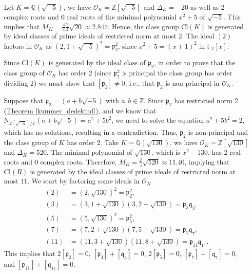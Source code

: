 \documentclass[openany, a4paper, 10pt]{book}
\theoremstyle{plain}
\theoremstyle{plain}
\theoremstyle{plain}
\theoremstyle{definition}
\theoremstyle{plain}
\theoremstyle{definition}
\theoremstyle{remark}
\newcommand{\theoref}[1]{\hyperref[#1]{Theorem \ref{#1}}}
\begin{document}
\begin{examplebox}
    Let $K = \mathbb Q(\sqrt{-5})$, we have $\mathcal O_K = \mathbb Z[\sqrt{-5}]$ and $\Delta_K = -20$ as well as 2 complex roots and 0 real roots of the minimal polynomial $x^2+5$ of $\sqrt{-5}$.
    This implies that $M_K = \frac{4}{\pi} \frac{2}{4} \sqrt{20} \approx 2.847.$
    Hence, the class group $\mathrm{Cl}(K)$ is generated by ideal classes of prime ideals of restricted norm at most $2$.
    The ideal $(2)$ factors in $\mathcal O_K$ as $(2, 1+\sqrt{-5})^2 = \mathfrak p_2^2$, since $x^2+5 = (x+1)^2$ in $\mathbb F_2[x]$.

    Since $\mathrm{Cl}(K)$ is generated by the ideal class of $\mathfrak p_2$, in order to prove that the class group of $\mathcal O_K$ has order 2 (since $\mathfrak p_2^2$ is principal the class group has order dividing 2) we must show that $[\mathfrak p_2] \neq 0$, i.e., that $\mathfrak p_2$ is non-principal in $\mathcal O_K$.

    Suppose that $\mathfrak p_2 = (a + b\sqrt{-5})$ with $a,b \in \mathbb Z$.
    Since $\mathfrak p_2$ has restricted norm $2$ (\theoref{kummer_dedekind}), and we know that $\mathrm{N}_{\mathbb Z[\sqrt{-5}] / \mathbb Z} (a+b\sqrt{-5}) = a^2+5b^2$, we need to solve the equation $a^2+5b^2 = 2$, which has no solutions, resulting in a contradiction.
    Thus, $\mathfrak p_2$ is non-principal and the class group of $K$ has order 2.
    \tcbline
    Take $K = \mathbb Q(\sqrt{130})$, we have $\mathcal O_K = \mathbb Z[\sqrt{130}]$ and $\Delta_K = 520$.
    The minimal polynomial of $\sqrt{130}$, which is $x^2-130$, has 2 real roots and 0 complex roots.
    Therefore, $M_K = \frac{2}{4} \sqrt{520} \approx 11.40$,
    implying that $\mathrm{Cl}(R)$ is generated by the ideal classes of prime ideals of restricted norm at most $11$.
    We start by factoring some ideals in $\mathcal O_K$
    {\allowdisplaybreaks\begin{align*}
        (2)  &= (2,\sqrt{130})^2 = \mathfrak p_2^2, \\
        (3)  &= (3,1+\sqrt{130})(3,2+\sqrt{130}) = \mathfrak p_3 \mathfrak q_3, \\
        (5)  &= (5, \sqrt{130})^2 = \mathfrak p_5^2, \\
        (7)  &= (7, 2+\sqrt{130})(7, 5+\sqrt{130}) = \mathfrak p_7 \mathfrak q_7, \\
        (11) &= (11, 3+\sqrt{130})(11, 8+\sqrt{130}) = \mathfrak p_{11} \mathfrak q_{11}.
    \end{align*}}%
    This implies that
    $2[\mathfrak p_2] = 0$, $[\mathfrak p_3] + [\mathfrak q_3] = 0$, $2[\mathfrak p_5] = 0$, $[\mathfrak p_7] + [\mathfrak q_7] = 0$, and $[\mathfrak p_{11}] + [\mathfrak q_{11}] = 0$.


\end{examplebox}
\end{document}
